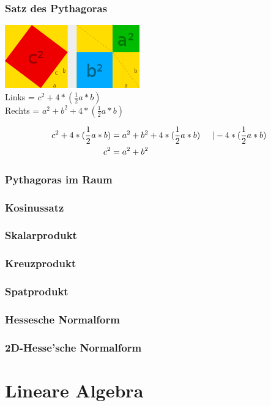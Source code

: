 \documentclass[a4paper]{article} %
\begin{document}
	\subsubsection{Satz des Pythagoras}
	\includegraphics[width=220 px, height=103 px]{pytha.png}\\
	Links = $c^2+ 4*(\frac{1}{2}a*b)$\\
	Rechts = $a^2+b^2+4*(\frac{1}{2}a*b)$

	\begin{align*}
	c^2+ 4*(\frac{1}{2}a*b) &= a^2+b^2+4*(\frac{1}{2}a*b)  \hspace{0.5 cm} |-4*(\frac{1}{2}a*b)\\
	c^2 &= a^2+b^2
	\end{align*}


	
	
	\subsubsection{Pythagoras im Raum}
	\subsubsection{Kosinussatz}
	\subsubsection{Skalarprodukt}
	\subsubsection{Kreuzprodukt}
	\subsubsection{Spatprodukt}
	\subsubsection{Hessesche Normalform}
	\subsubsection{2D-Hesse'sche Normalform}
	\section{Lineare Algebra}
\end{document}
